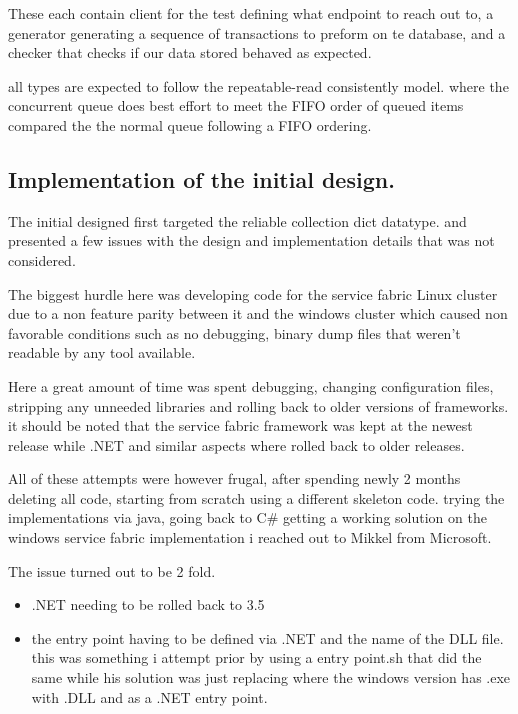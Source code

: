 \documentclass[a4paper,10pt,titlepage]{report}
\begin{document}
    These each contain client for the test defining what endpoint to reach out to, a generator generating a sequence of transactions to preform on te database, and a checker that checks if our data stored behaved as expected.

    all types are expected to follow the repeatable-read consistently model. where the concurrent queue does best effort to meet the FIFO order of queued items compared the the normal queue following a FIFO ordering.

    \subsection{Implementation of the initial design.}

    The initial designed first targeted the reliable collection dict datatype. and presented a few issues with the design and implementation details that was not considered.

    The biggest hurdle here was developing code for the service fabric Linux cluster due to a non feature parity between it and the windows cluster which caused non favorable conditions such as no debugging, binary dump files that weren't readable by any tool available.

    Here a great amount of time was spent debugging, changing configuration files, stripping any unneeded libraries and rolling back to older versions of frameworks. it should be noted that the service fabric framework was kept at the newest release while .NET and similar aspects where rolled back to older releases.

    All of these attempts were however frugal, after spending newly 2 months deleting all code, starting from scratch using a different skeleton code. trying the implementations via java, going back to C\# getting a working solution on the windows service fabric implementation i reached out to Mikkel from Microsoft.

    The issue turned out to be 2 fold.
    \begin{itemize}
        \item .NET needing to be rolled back to 3.5
        \item the entry point having to be defined via .NET and the name of the DLL file. this was something i attempt prior by using a entry point.sh that did the same while his solution was just replacing where the windows version has .exe with .DLL and as a .NET entry point.
    \end{itemize}
\end{document}
